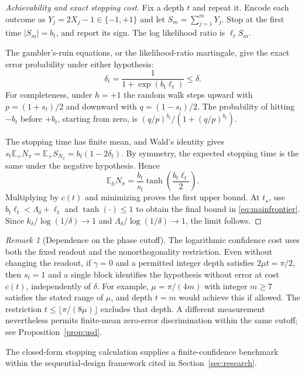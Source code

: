 \documentclass[11pt,a4paper]{article}
\newcommand{\E}{\mathbb E}
\theoremstyle{definition}
\theoremstyle{remark}
\newtheorem{remark}[theorem]{Remark}
\numberwithin{equation}{section}
\begin{document}
\begin{proof}[Achievability and exact stopping cost]
Fix a depth $t$ and repeat it. Encode each outcome as
$Y_j=2X_j-1\in\{-1,+1\}$ and let $S_m=\sum_{j=1}^mY_j$.
Stop at the first time $|S_m|=b_t$, and report its sign. The
log likelihood ratio is $\ell_tS_m$.

The gambler's-ruin equations, or the likelihood-ratio martingale, give
the exact error probability under either hypothesis:
\begin{equation}\label{eq:exacterror}
 \delta_t=\frac1{1+\exp(b_t\ell_t)}\leq\delta.
\end{equation}
For completeness, under $h=+1$ the random walk steps upward with
$p=(1+s_t)/2$ and downward with $q=(1-s_t)/2$.
The probability of hitting $-b_t$ before $+b_t$, starting from zero, is
$(q/p)^{b_t}/(1+(q/p)^{b_t})$.

The stopping time has finite mean, and Wald's identity gives
$s_t\E_+N_\pi=\E_+S_{N_\pi}
=b_t(1-2\delta_t)$. By symmetry, the expected stopping time is the same
under the negative hypothesis. Hence
\begin{equation}\label{eq:exactcost}
 \E_hN_\pi=\frac{b_t}{s_t}
 \tanh\!\left(\frac{b_t\ell_t}{2}\right).
\end{equation}
Multiplying by $c(t)$ and minimizing proves the first upper bound.
At $t_\star$, use $b_t\ell_t<\Lambda_\delta+\ell_t$ and
$\tanh(\cdot)\leq1$ to obtain the final bound in
\eqref{eq:mainfrontier}. Since $k_\delta/\log(1/\delta)\to1$ and
$\Lambda_\delta/\log(1/\delta)\to1$, the limit follows.
\end{proof}

\begin{remark}[Dependence on the phase cutoff]\label{rem:cutoff}
The logarithmic confidence cost uses both the fixed readout and the
nonorthogonality restriction. Even without changing the readout, if $\gamma=0$ and a permitted integer
depth satisfies $2\mu t=\pi/2$, then $s_t=1$ and a single block identifies
the hypothesis without error at cost $c(t)$, independently of $\delta$.
For example, $\mu=\pi/(4m)$ with integer $m\geq7$ satisfies the stated
range of $\mu$, and depth $t=m$ would achieve this if allowed.
The restriction $t\leq\lfloor\pi/(8\mu)\rfloor$ excludes that depth.
A different measurement nevertheless permits finite-mean zero-error
discrimination within the same cutoff; see Proposition~\ref{prop:usd}.
\end{remark}

The closed-form stopping calculation supplies a finite-confidence
benchmark within the sequential-design framework cited in Section~\ref{sec:research}.
\end{document}
